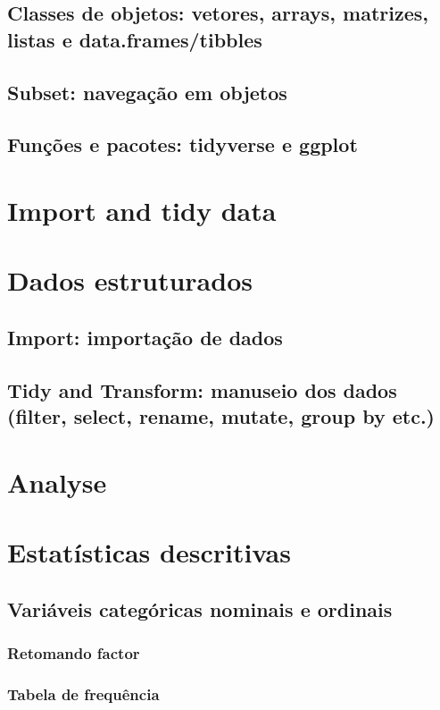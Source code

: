 \documentclass[a4paper,12pt]{article}
\begin{document}
\subsection*{Classes de objetos: vetores, arrays, matrizes, listas e data.frames/tibbles}
\subsection*{Subset: navegação em objetos}
\subsection*{Funções e pacotes: tidyverse e ggplot}

\section{Import and tidy data}
\section*{Dados estruturados}
\subsection*{Import: importação de dados}
\subsection*{Tidy and Transform: manuseio dos dados (filter, select, rename, mutate, group by etc.)}

\pagebreak

\section{Analyse}
\section*{Estatísticas descritivas}

\subsection*{Variáveis categóricas nominais e ordinais}
\subsubsection*{Retomando factor}
\subsubsection*{Tabela de frequência}
\end{document}
